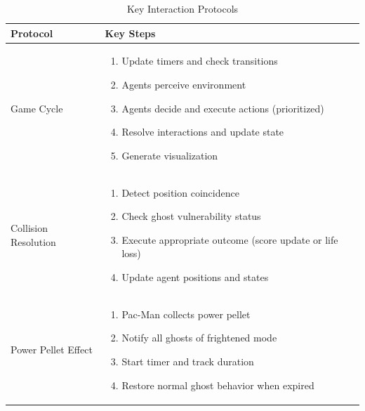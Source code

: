 \documentclass[a4paper, 11pt]{article}
\begin{document}
\begin{table}[h]
\centering
\caption{Key Interaction Protocols}
\begin{tabular}{|p{3.5cm}|p{10.5cm}|}
\hline
\textbf{Protocol} & \textbf{Key Steps} \\
\hline
Game Cycle & 
\begin{enumerate}
    \item Update timers and check transitions
    \item Agents perceive environment
    \item Agents decide and execute actions (prioritized)
    \item Resolve interactions and update state
    \item Generate visualization
\end{enumerate} \\
\hline
Collision Resolution & 
\begin{enumerate}
    \item Detect position coincidence
    \item Check ghost vulnerability status
    \item Execute appropriate outcome (score update or life loss)
    \item Update agent positions and states
\end{enumerate} \\
\hline
Power Pellet Effect & 
\begin{enumerate}
    \item Pac-Man collects power pellet
    \item Notify all ghosts of frightened mode
    \item Start timer and track duration
    \item Restore normal ghost behavior when expired
\end{enumerate} \\
\hline
\end{tabular}
\end{table}

%
% 
% 
\end{document}
